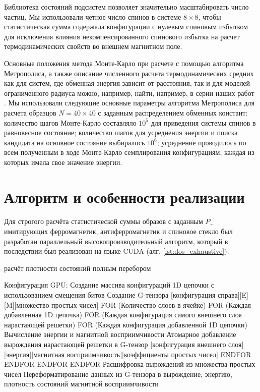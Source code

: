 Библиотека состояний подсистем позволяет значительно масштабировать число частиц. Мы использовали четное число спинов в системе $8\times8$, чтобы статистическая сумма содержала конфигурации с нулевым спиновым избытком для исключения влияния некомпенсированного спинового избытка на расчет термодинамических свойств во внешнем магнитном поле.

Основные положения метода Монте-Карло при расчете с помощью алгоритма Метрополиса, а также описание численного расчета термодинамических средних как для систем, где обменная энергия зависит от расстояния, так и для моделей ограниченного радиуса можно, например, найти, например, в серии наших работ  \cite{Shevchenko2017, makarov2019, Shevchenko2022, makarova2023}. Мы использовали следующие основные параметры алгоритма Метрополиса для расчета образцов $N=40\times40$ с заданным распределением обменных констант: количество шагов Монте-Карло составляло $10^5$ для приведения системы спинов в равновесное состояние; количество шагов для усреднения энергии и поиска кандидата на основное состояние выбиралось $10^6$; усреднение проводилось по всем полученным в ходе Монте-Карло семплирования конфигурациям, каждая из которых имела свое значение энергии.

\section{Алгоритм и особенности реализации}

Для строгого расчёта статистической суммы образов с заданным $P_+$ имитирующих ферромагнетик, антиферромагнетик и спиновое стекло был разработан параллельный высокопроизводительный алгоритм, который в последствии был реализован на языке CUDA (алг. \cref{lst:dos_exhaustive}).


\begin{ListingEnv}[!h]
	\captiondelim{ } %
	\caption{расчёт плотности состояний полным перебором}\label{lst:dos_exhaustive}
	\begin{Verb}
Конфигурация GPU:
Создание массива конфигураций 1D цепочки с использованием смещения битов
Создание G-тензора [конфигурация справа][E][M][множество простых чисел]
 FOR (Количество слоев в ячейке)
 {
  FOR (Каждая добавленная 1D цепочка)
  {
   FOR (Каждая конфигурация самого внешнего слоя нарастающей решетки)
   {
    FOR (Каждая конфигурация добавленной 1D цепочки)
     Вычисление энергии и магнитной восприимчивости
     Атомарное добавление вырождения нарастающей решетки в 
     G-тензор [конфигурация внешнего слоя][энергия][магнитная 
     восприимчивость][коэффициенты простых чисел]
    ENDFOR
   }
   ENDFOR
  }
  ENDFOR
 }
 ENDFOR
Расшифровка вырождений из множества простых чисел
Переформатирование данных из G-тензора в вырождение, энергию, плотность 
состояний магнитной восприимчивости
	\end{Verb}
\end{ListingEnv}

